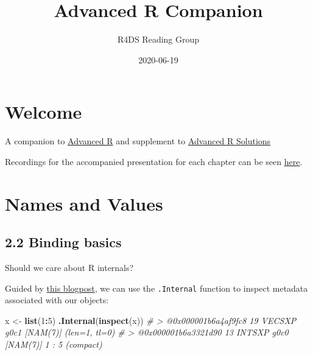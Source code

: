 \documentclass[]{book}
\title{Advanced R Companion}
\author{R4DS Reading Group}
\date{2020-06-19}
\newenvironment{Shaded}{\begin{snugshade}}{\end{snugshade}}
\newcommand{\CommentTok}[1]{\textcolor[rgb]{0.56,0.35,0.01}{\textit{#1}}}
\newcommand{\DecValTok}[1]{\textcolor[rgb]{0.00,0.00,0.81}{#1}}
\newcommand{\KeywordTok}[1]{\textcolor[rgb]{0.13,0.29,0.53}{\textbf{#1}}}
\newcommand{\NormalTok}[1]{#1}
\newcommand{\OperatorTok}[1]{\textcolor[rgb]{0.81,0.36,0.00}{\textbf{#1}}}
\newcommand{\StringTok}[1]{\textcolor[rgb]{0.31,0.60,0.02}{#1}}
\begin{document}
\maketitle

{
\setcounter{tocdepth}{1}
\tableofcontents
}
\hypertarget{welcome}{%
\chapter{Welcome}\label{welcome}}

A companion to \href{https://adv-r.hadley.nz/rcpp.html\#acknowledgments}{Advanced R} and supplement to \href{https://advanced-r-solutions.rbind.io/names-and-values.html\#copy-on-modify}{Advanced R Solutions}

Recordings for the accompanied presentation for each chapter can be seen \href{https://www.youtube.com/watch?v=pQ-xDAPEQaw\&list=PL3x6DOfs2NGi9lH7q-phZlPrl6HKXYDbn}{here}.

\hypertarget{names-and-values}{%
\chapter{Names and Values}\label{names-and-values}}

\hypertarget{binding-basics}{%
\section*{2.2 Binding basics}\label{binding-basics}}

Should we care about R internals?

Guided by \href{https://www.brodieg.com/2019/02/18/an-unofficial-reference-for-internal-inspect/}{this blogpost}, we can use the \texttt{.Internal} function to inspect metadata associated with our objects:

\begin{Shaded}
\begin{Highlighting}[]
\NormalTok{ x <-}\StringTok{ }\KeywordTok{list}\NormalTok{(}\DecValTok{1}\OperatorTok{:}\DecValTok{5}\NormalTok{)}
\KeywordTok{.Internal}\NormalTok{(}\KeywordTok{inspect}\NormalTok{(x))}
\CommentTok{# > @0x000001b6a4af9fc8 19 VECSXP g0c1 [NAM(7)] (len=1, tl=0)}
\CommentTok{# > @0x000001b6a3321d90 13 INTSXP g0c0 [NAM(7)]  1 : 5 (compact)}
\end{Highlighting}
\end{Shaded}
\end{document}

